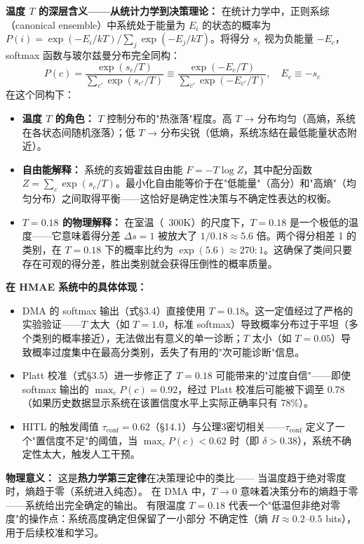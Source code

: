\documentclass[11pt,a4paper]{ctexart}
\theoremstyle{remark}
\begin{document}
\textbf{温度 $T$ 的深层含义——从统计力学到决策理论：}
在统计力学中，正则系综（canonical ensemble）中系统处于能量为 $E_i$ 的状态的概率为 $P(i) = \exp(-E_i/kT) / \sum_j \exp(-E_j/kT)$。将得分 $s_c$ 视为负能量 $-E_c$，softmax 函数与玻尔兹曼分布完全同构：
\[
P(c) = \frac{\exp(s_c/T)}{\sum_{c'} \exp(s_{c'}/T)} \equiv \frac{\exp(-E_c/T)}{\sum_{c'} \exp(-E_{c'}/T)}, \quad E_c \equiv -s_c
\]
在这个同构下：
\begin{itemize}[nosep]
\item \textbf{温度 $T$ 的角色：} $T$ 控制分布的"热涨落"程度。高 $T$ → 分布均匀（高熵，系统在各状态间随机涨落）；低 $T$ → 分布尖锐（低熵，系统冻结在最低能量状态附近）。
\item \textbf{自由能解释：} 系统的亥姆霍兹自由能 $F = -T \log Z$，其中配分函数 $Z = \sum_{c} \exp(s_c/T)$。最小化自由能等价于在"低能量"（高分）和"高熵"（均匀分布）之间取得平衡——这恰好是确定性决策与不确定性表达的权衡。
\item \textbf{$T=0.18$ 的物理解释：} 在室温（~300K）的尺度下，$T=0.18$ 是一个极低的温度——它意味着得分差 $\Delta s = 1$ 被放大了 $1/0.18 \approx 5.6$ 倍。两个得分相差 1 的类别，在 $T=0.18$ 下的概率比约为 $\exp(5.6) \approx 270:1$。这确保了类间只要存在可观的得分差，胜出类别就会获得压倒性的概率质量。
\end{itemize}

\textbf{在 HMAE 系统中的具体体现：}
\begin{itemize}[nosep]
\item DMA 的 softmax 输出（式§3.4）直接使用 $T=0.18$。这一定值经过了严格的实验验证——$T$ 太大（如 $T=1.0$，标准 softmax）导致概率分布过于平坦（多个类别的概率接近），无法做出有意义的单一诊断；$T$ 太小（如 $T=0.05$）导致概率过度集中在最高分类别，丢失了有用的"次可能诊断"信息。
\item Platt 校准（式§3.5）进一步修正了 $T=0.18$ 可能带来的"过度自信"——即使 softmax 输出的 $\max_c P(c) = 0.92$，经过 Platt 校准后可能被下调至 0.78（如果历史数据显示系统在该置信度水平上实际正确率只有 78\%）。
\item HITL 的触发阈值 $\tau_{\text{conf}}=0.62$（§14.1）与公理3密切相关——$\tau_{\text{conf}}$ 定义了一个"置信度不足"的阈值，当 $\max_c P(c) < 0.62$ 时（即 $\delta > 0.38$），系统不确定性太大，触发人工干预。
\end{itemize}

\textbf{物理意义：} 这是\textbf{热力学第三定律}在决策理论中的类比——
当温度趋于绝对零度时，熵趋于零（系统进入纯态）。
在 DMA 中，$T \to 0$ 意味着决策分布的熵趋于零——系统给出完全确定的输出。
有限温度 $T = 0.18$ 代表一个"低温但非绝对零度"的操作点：系统高度确定但保留了一小部分
不确定性（熵 $H \approx 0.2$--$0.5$ bits），用于后续校准和学习。
\end{document}
